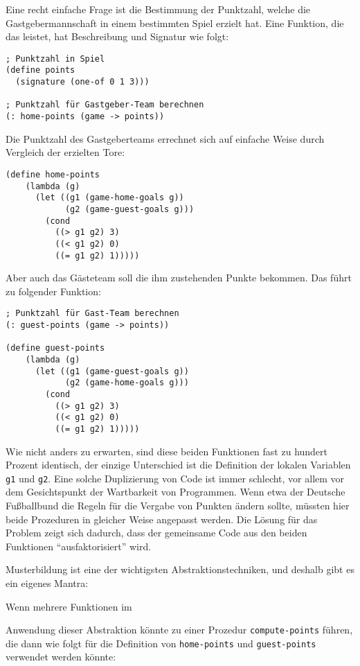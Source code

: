 Eine recht einfache Frage ist die Bestimmung der Punktzahl, welche die
Gastgebermannschaft in einem bestimmten Spiel erzielt hat. Eine Funktion, die
das leistet, hat Beschreibung und Signatur wie
folgt:

\begin{verbatim}
; Punktzahl in Spiel
(define points
  (signature (one-of 0 1 3)))

; Punktzahl für Gastgeber-Team berechnen
(: home-points (game -> points))
\end{verbatim}
Die Punktzahl des Gastgeberteams errechnet sich auf einfache Weise durch
Vergleich der erzielten Tore:
\begin{verbatim}
(define home-points
    (lambda (g)
      (let ((g1 (game-home-goals g))
            (g2 (game-guest-goals g)))
        (cond
          ((> g1 g2) 3)
          ((< g1 g2) 0)
          ((= g1 g2) 1)))))
\end{verbatim}
Aber auch das Gästeteam soll die ihm zustehenden Punkte bekommen. Das führt zu
folgender Funktion:
\begin{verbatim}
; Punktzahl für Gast-Team berechnen
(: guest-points (game -> points))

(define guest-points
    (lambda (g)
      (let ((g1 (game-guest-goals g))
            (g2 (game-home-goals g)))
        (cond
          ((> g1 g2) 3)
          ((< g1 g2) 0)
          ((= g1 g2) 1)))))
\end{verbatim}
Wie nicht anders zu erwarten, sind diese beiden Funktionen fast zu hundert
Prozent identisch, der einzige Unterschied ist die Definition der lokalen
Variablen \texttt{g1} und \texttt{g2}. Eine solche Duplizierung von Code ist
immer schlecht, vor allem vor dem Gesichtspunkt der Wartbarkeit von
Programmen. Wenn etwa der Deutsche Fußballbund die Regeln für die Vergabe von
Punkten ändern sollte, müssten hier beide Prozeduren in gleicher Weise
angepasst werden.  Die Lösung für das Problem zeigt sich dadurch, dass der
gemeinsame Code aus den beiden Funktionen "`ausfaktorisiert"' wird. 

Musterbildung ist eine der wichtigsten Abstraktionstechniken, und deshalb gibt
es ein eigenes Mantra:

\begin{mantra}\label{mantra:abstraction} Wenn mehrere Funktionen im
  
\end{mantra}

Anwendung dieser Abstraktion könnte zu einer Prozedur \texttt{compute-points}
führen, die dann wie folgt für die Definition von \texttt{home-points} und
\texttt{guest-points} verwendet werden könnte:

